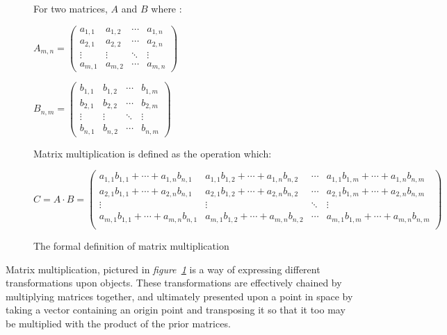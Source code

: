 \begin{figure}[H]
	\begin{center}
		For two matrices, $A$ and $B$ where :

		\vspace{1cm}

$A_{m,n} = 
\begin{pmatrix}
a_{1,1} & a_{1,2} & \cdots & a_{1,n} \\
a_{2,1} & a_{2,2} & \cdots & a_{2,n} \\
\vdots  & \vdots  & \ddots & \vdots  \\
a_{m,1} & a_{m,2} & \cdots & a_{m,n} 
\end{pmatrix}$

		\vspace{1cm}

$B_{n,m} = 
\begin{pmatrix}
b_{1,1} & b_{1,2} & \cdots & b_{1,m} \\
b_{2,1} & b_{2,2} & \cdots & b_{2,m} \\
\vdots  & \vdots  & \ddots & \vdots  \\
b_{n,1} & b_{n,2} & \cdots & b_{n,m} 
\end{pmatrix}$

		\vspace{1cm}
		Matrix multiplication is defined as the operation which:
		\vspace{1cm}

$C = A \cdot B =
\begin{pmatrix}
	a_{1,1}b_{1,1} + \cdots + a_{1,n}b_{n,1} & a_{1,1}b_{1,2} + \cdots + a_{1,n}b_{n,2} & \cdots & a_{1,1}b_{1,m} + \cdots + a_{1,n}b_{n,m} \\
	a_{2,1}b_{1,1} + \cdots + a_{2,n}b_{n,1} & a_{2,1}b_{1,2} + \cdots + a_{2,n}b_{n,2} & \cdots & a_{2,1}b_{1,m} + \cdots + a_{2,n}b_{n,m} \\
\vdots  & \vdots  & \ddots & \vdots  \\
	a_{m,1}b_{1,1} + \cdots + a_{m,n}b_{n,1} & a_{m,1}b_{1,2} + \cdots + a_{m,n}b_{n,2} & \cdots & a_{m,1}b_{1,m} + \cdots + a_{m,n}b_{n,m} \\
\end{pmatrix}$
	\caption{The formal definition of matrix multiplication}
	\label{matmul}
	\end{center}
\end{figure}

Matrix multiplication, pictured in \textit{figure~\ref{matmul}} is a way of expressing different transformations upon objects. These transformations are effectively chained by multiplying matrices together, and ultimately presented upon a point in space by taking a vector containing an origin point and transposing it so that it too may be multiplied with the product of the prior matrices.

